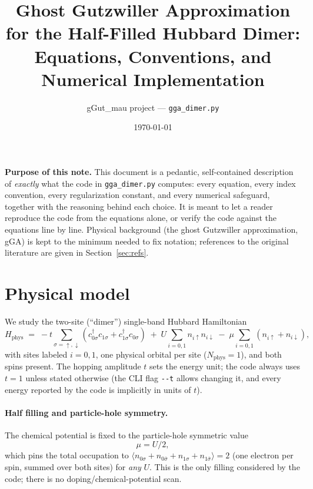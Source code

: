 \documentclass[11pt]{article}
\title{Ghost Gutzwiller Approximation for the Half-Filled Hubbard Dimer:\\
Equations, Conventions, and Numerical Implementation}
\author{gGut\_mau project --- \texttt{gga\_dimer.py}}
\date{\today}
\newcommand{\Nphys}{N_{\mathrm{phys}}}
\begin{document}
\maketitle
\tableofcontents

\bigskip
\noindent\textbf{Purpose of this note.} This document is a pedantic, self-contained
description of \emph{exactly} what the code in \texttt{gga\_dimer.py} computes: every
equation, every index convention, every regularization constant, and every numerical
safeguard, together with the reasoning behind each choice. It is meant to let a reader
reproduce the code from the equations alone, or verify the code against the equations
line by line. Physical background (the ghost Gutzwiller approximation, gGA) is kept to
the minimum needed to fix notation; references to the original literature are given in
Section~\ref{sec:refs}.

\section{Physical model}
\label{sec:model}

We study the two-site (``dimer'') single-band Hubbard Hamiltonian
\begin{equation}
  H_{\mathrm{phys}} \;=\; -t\sum_{\sigma=\uparrow,\downarrow}
      \left( c^{\dagger}_{0\sigma} c_{1\sigma} + c^{\dagger}_{1\sigma} c_{0\sigma}\right)
      \;+\; U\sum_{i=0,1} n_{i\uparrow} n_{i\downarrow}
      \;-\; \mu \sum_{i=0,1}\left(n_{i\uparrow}+n_{i\downarrow}\right),
  \label{eq:Hphys}
\end{equation}
with sites labeled $i=0,1$, one physical orbital per site
($\Nphys=1$), and both spins present. The hopping amplitude $t$ sets the energy
unit; the code always uses $t=1$ unless stated otherwise (the CLI flag \texttt{-{}-t}
allows changing it, and every energy reported by the code is implicitly in units
of $t$).

\paragraph{Half filling and particle-hole symmetry.} The chemical potential is
fixed to the particle-hole symmetric value
\begin{equation}
  \mu = U/2 ,
\end{equation}
which pins the total occupation to $\langle n_{0\sigma}+n_{0\bar\sigma}+n_{1\sigma}+n_{1\bar\sigma}\rangle=2$
(one electron per spin, summed over both sites) for \emph{any} $U$. This is the only
filling considered by the code; there is no doping/chemical-potential scan.
\end{document}
